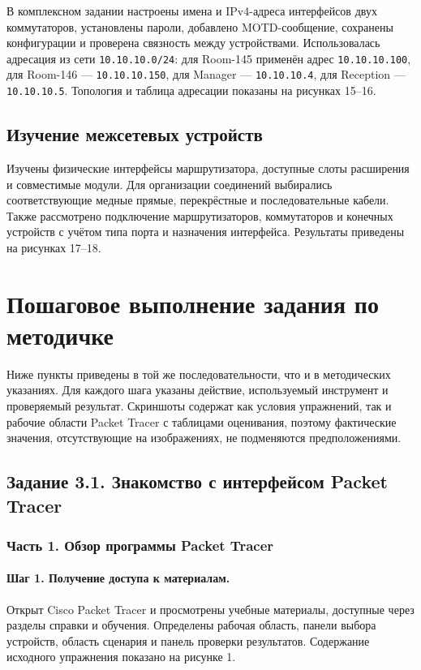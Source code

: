 \documentclass[a4paper,14pt,oneside]{extarticle}
\begin{document}
В комплексном задании настроены имена и IPv4-адреса интерфейсов двух
коммутаторов, установлены пароли, добавлено MOTD-сообщение, сохранены
конфигурации и проверена связность между устройствами. Использовалась
адресация из сети \texttt{10.10.10.0/24}: для Room-145 применён адрес
\texttt{10.10.10.100}, для Room-146 --- \texttt{10.10.10.150}, для Manager ---
\texttt{10.10.10.4}, для Reception --- \texttt{10.10.10.5}. Топология и
таблица адресации показаны на рисунках 15--16.

\subsection{Изучение межсетевых устройств}

Изучены физические интерфейсы маршрутизатора, доступные слоты расширения и
совместимые модули. Для организации соединений выбирались соответствующие
медные прямые, перекрёстные и последовательные кабели. Также рассмотрено
подключение маршрутизаторов, коммутаторов и конечных устройств с учётом типа
порта и назначения интерфейса. Результаты приведены на рисунках 17--18.

\section{Пошаговое выполнение задания по методичке}

Ниже пункты приведены в той же последовательности, что и в методических
указаниях. Для каждого шага указаны действие, используемый инструмент и
проверяемый результат. Скриншоты содержат как условия упражнений, так и
рабочие области Packet Tracer с таблицами оценивания, поэтому фактические
значения, отсутствующие на изображениях, не подменяются предположениями.

\subsection{Задание 3.1. Знакомство с интерфейсом Packet Tracer}

\subsubsection{Часть 1. Обзор программы Packet Tracer}

\paragraph{Шаг 1. Получение доступа к материалам.}
Открыт Cisco Packet Tracer и просмотрены учебные материалы, доступные через
разделы справки и обучения. Определены рабочая область, панели выбора
устройств, область сценария и панель проверки результатов. Содержание
исходного упражнения показано на рисунке 1.
\end{document}
